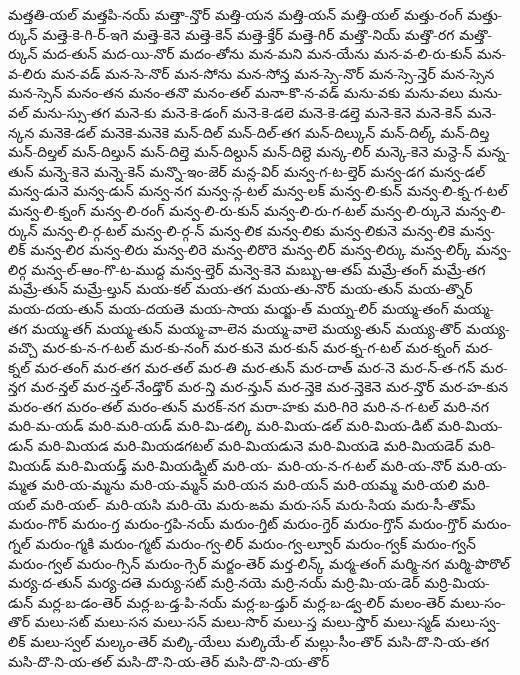 {మత్తతి-యల్
మత్తపి-నయ్
మత్తా-న్తొర్
మత్తి-యన
మత్తి-యన్
మత్తి-యల్
మత్తు-రంగ్
మత్తు-ర్కున్
మత్తె-కె-గి-ర్-ఇగె
మత్తె-కెనె
మత్తె-కెన్
మత్తె-క్తేర్
మత్తె-గిర్
మత్తొ-నియ్
మత్తొ-రగ
మత్తొ-ర్కున్
మద-తున్
మద-యి-నొర్
మదం-తోను
మన-మని
మన-యేను
మన-వ-లి-రు-కున్
మన-వ-లిరు
మన-వడ్
మన-సె-నొర్
మన-సోను
మన-సోన్త
మన-స్సె-నొర్
మన-స్సె-న్తెర్
మన-స్సెన
మన-స్సెన్
మనం-తన
మనం-తనొ
మనం-తల్
మనా-కొ-న-వడ్
మను-వకు
మను-వలు
మను-వల్
మను-స్సు-తగ
మనె-కు
మనె-కె-డంగ్
మనె-కె-డలె
మనె-కె-డల్తె
మనె-కెనె
మనె-కెన్
మనె-న్కన
మనెకె-డల్
మనెకె-మనెకె
మన్-దిల్
మన్-దిల్-తగ
మన్-దిల్కున్
మన్-దిల్క్
మన్-దిల్త
మన్-దిల్తల్
మన్-దిల్తున్
మన్-దిల్తె
మన్-దిల్దున్
మన్-దిల్దె
మన్క-లిర్
మన్కె-కెనె
మన్దె-న్
మన్న-తున్
మన్నె-కెనె
మన్నె-కెన్
మన్నొ-ఇం-జెర్
మన్ల-విర్
మన్వ-గ-ట-ల్తెర్
మన్వ-డగ
మన్వ-డల్
మన్వ-డునె
మన్వ-డున్
మన్వ-నగ
మన్వ-న్గ-టల్
మన్వ-లక్
మన్వ-లి-కున్
మన్వ-లి-క్న-గ-టల్
మన్వ-లి-క్నంగ్
మన్వ-లి-రంగ్
మన్వ-లి-రు-కున్
మన్వ-లి-రు-గ-టల్
మన్వ-లి-ర్కునె
మన్వ-లి-ర్కున్
మన్వ-లి-ర్గ-టల్
మన్వ-లి-ర్గ-న్
మన్వ-లిక
మన్వ-లికు
మన్వ-లికునె
మన్వ-లికె
మన్వ-లిక్
మన్వ-లిర
మన్వ-లిరు
మన్వ-లిరె
మన్వ-లిరొరె
మన్వ-లిర్
మన్వ-లిర్కు
మన్వ-లిర్క్
మన్వ-లిర్గ
మన్వ-ల్-ఆం-గొ-ట-ముద్ద
మన్వ-ల్తెర్
మన్వె-కెనె
మబ్బు-ఆ-తప్
మమ్రే-తంగ్
మమ్రే-తగ
మమ్రే-తున్
మమ్రే-ల్తున్
మయ-కల్
మయ-తగ
మయ-తు-నొర్
మయ-తున్
మయ-త్నొర్
మయ-దయ-తున్
మయ-దయతె
మయ-సాయ
మయ్జ-త్
మయ్న-లిర్
మయ్మ-తంగ్
మయ్మ-తగ
మయ్మ-తగ్
మయ్మ-తున్
మయ్మ-వా-లెన
మయ్మ-వాలె
మయ్య-తున్
మయ్య-తొర్
మయ్య-వచ్చొ
మర-కు-న-గ-టల్
మర-కు-నంగ్
మర-కునె
మర-కున్
మర-క్న-గ-టల్
మర-క్నంగ్
మర-క్నల్
మర-తంగ్
మర-తగ
మర-తల్
మర-తి
మర-తున్
మర-దాత్
మర-నె
మర-న్-త-గన్
మర-న్తగ
మర-న్తల్
మర-న్తల్-నేండ్తొర్
మర-న్తి
మర-న్తున్
మర-న్తెకె
మర-న్తెకెనె
మర-న్తొర్
మర-హ-కున
మరం-తగ
మరం-తల్
మరం-తున్
మరక్-నగ
మరా-హకు
మరి-గిరె
మరి-న-గ-టల్
మరి-నగ
మరి-మ-యడ్
మరి-మరి-యడ్
మరి-మి-డల్కి
మరి-మియ-డల్
మరి-మియ-డిట్
మరి-మియ-డున్
మరి-మియడ
మరి-మియడగటల్
మరి-మియడునె
మరి-మియడె
మరి-మియడెర్
మరి-మియడ్
మరి-మియడ్త్
మరి-మియడ్నిట్
మరి-య-
మరి-య-న-గ-టల్
మరి-య-నొర్
మరి-య-మ్మత
మరి-య-మ్మను
మరి-య-మ్మన్
మరి-యన
మరి-యన్
మరి-యమ్మ
మరి-యలి
మరి-యల్
మరి-యల్-
మరి-యసి
మరి-యె
మరు-ఙమ
మరు-సన్
మరు-సియ
మరు-సీ-తొమ్
మరుం-గొర్
మరుం-గ్త
మరుం-గ్తపి-నయ్
మరుం-గ్తిట్
మరుం-గ్తెర్
మరుం-గ్తొన్
మరుం-గ్తొర్
మరుం-గ్నల్
మరుం-గ్మకి
మరుం-గ్మట్
మరుం-గ్వ-లిర్
మరుం-గ్వ-ల్వూర్
మరుం-గ్వక్
మరుం-గ్వన్
మరుం-గ్వల్
మరుం-గ్సిన్
మరుం-గ్సెర్
మర్ఙం-తెర్
మర్త-లిన్క్
మర్మ-తంగ్
మర్మి-నగ
మర్మి-పొరొల్
మర్య-ద-తున్
మర్య-దతె
మర్యు-సట్
మర్రి-నయె
మర్రి-నయ్
మర్రి-మి-య-డెర్
మర్రి-మియ-డున్
మర్ల-బ-డం-తెర్
మర్ల-బ-డ్త-పి-నయ్
మర్ల-బ-డ్తుర్
మర్ల-బ-డ్వ-లిర్
మలం-తెర్
మలు-సం-తొర్
మలు-సట్
మలు-సన
మలు-సన్
మలు-సొర్
మలు-స్త
మలు-స్తొర్
మలు-స్మడ్
మలు-స్వ-లిక్
మలు-స్వల్
మల్కం-తెర్
మల్కి-యేలు
మల్కియే-ల్
మల్లు-సీం-తొర్
మసి-దొ-ని-య-తగ
మసి-దొ-ని-య-తల్
మసి-దొ-ని-య-తెర్
మసి-దొ-ని-య-తొర్
}

